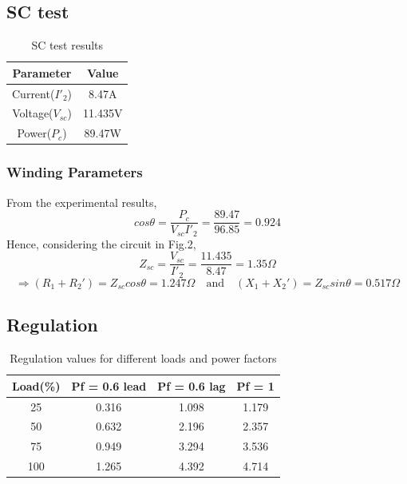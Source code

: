 \documentclass[12pt]{article}
\begin{document}
        \subsection{SC test}
        
            \begin{table}[H]
                \centering
                \begin{tabular}{|c|c|}
                    \hline
                    Parameter & Value\\
                    \hline
                    Current($I'_2$) & 8.47A \\
                    Voltage($V_{sc}$) & 11.435V \\
                    Power($P_c$) & 89.47W\\
                    \hline
                \end{tabular}
                \caption{SC test results}
                \label{tab:my_label}
            \end{table}
            
            \subsubsection{Winding Parameters}
            From the experimental results,
            \vspace{-15pt}
            $$cos\theta=\dfrac{P_c}{V_{sc}I'_2}=\dfrac{89.47}{96.85}=0.924$$
            Hence, considering the circuit in Fig.2,$$Z_{sc}=\dfrac{V_{sc}}{I'_2}=\dfrac{11.435}{8.47}=1.35\Omega$$
            \begin{equation}
                 \Rightarrow(R_1+R_2')=Z_{sc}cos\theta=1.247\Omega
                    \quad\text{and}\quad 
                (X_1+X_2')=Z_{sc}sin\theta=0.517\Omega
\end{equation}
        \subsection{Regulation}
           
            \begin{table}[H]
                \centering
                \begin{tabular}{|c|c|c|c|}
                \hline 
                    Load(\%) & Pf = 0.6 lead & Pf = 0.6 lag & Pf = 1 \\\hline
                    25 & 0.316 & 1.098 & 1.179 \\\hline
                    50 & 0.632 & 2.196 & 2.357 \\\hline
                    75 & 0.949 & 3.294 & 3.536 \\\hline
                    100 & 1.265 & 4.392 & 4.714 \\\hline
                \end{tabular}
                \caption{Regulation values for different loads and power factors}
            \end{table}  
            
\end{document}
